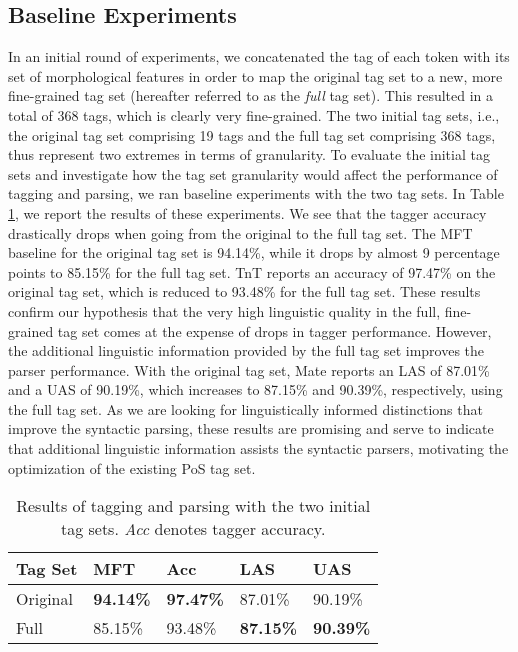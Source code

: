 \documentclass[11pt,a4paper]{article}
\begin{document}
\subsection{Baseline Experiments}
In an initial round of experiments, we concatenated the tag of each token with
its set of morphological features in order to map the original tag set to a
new, more fine-grained tag set (hereafter referred to as the \emph{full} tag
set). This resulted in a total of 368 tags, which is clearly very fine-grained.
The two initial tag sets, i.e., the original tag set comprising 19 tags and the
full tag set comprising 368 tags, thus represent two extremes in terms of
granularity. To evaluate the initial tag sets and investigate how the tag set
granularity would affect the performance of tagging and parsing, we ran
baseline experiments with the two tag sets. In Table \ref{inittagseteval}, we
report the results of these experiments. We see that the tagger accuracy
drastically drops when going from the original to the full tag set. The MFT
baseline for the original tag set is 94.14\%, while it drops by almost 9
percentage points to 85.15\% for the full tag set. TnT reports an accuracy of
97.47\% on the original tag set, which is reduced to 93.48\% for the full tag
set. These results confirm our hypothesis that the very high linguistic quality
in the full, fine-grained tag set comes at the expense of drops in tagger
performance.  However, the additional linguistic information provided by the
full tag set improves the parser performance. With the original tag set, Mate
reports an LAS of 87.01\% and a UAS of 90.19\%, which increases to 87.15\% and
90.39\%, respectively, using the full tag set. As we are looking for
linguistically informed distinctions that improve the syntactic parsing, these
results are promising and serve to indicate that additional linguistic
information assists the syntactic parsers, motivating the optimization of the
existing PoS tag set.

\begin{table}
    \centering
    \smaller[0.5]
    \begin{tabular}{@{}lllll@{}}
        \toprule
        \textbf{Tag Set} & \textbf{MFT} & \textbf{Acc} &
        \textbf{LAS} & \textbf{UAS} \\
        \midrule
        Original & \textbf{94.14\%} & \textbf{97.47\%} & 87.01\% & 90.19\% \\
        Full & 85.15\% & 93.48\% & \textbf{87.15\%} & \textbf{90.39\%} \\
        \bottomrule
    \end{tabular}
    \caption{Results of tagging and parsing with the two initial tag sets.
        \emph{Acc} denotes tagger accuracy.}
    \label{inittagseteval}
\end{table}
\end{document}
